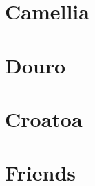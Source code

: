 

\begin{multicols}{2}

\section{Camellia}


\section{Douro}


\section{Croatoa}


\section{Friends}


\end{multicols}
